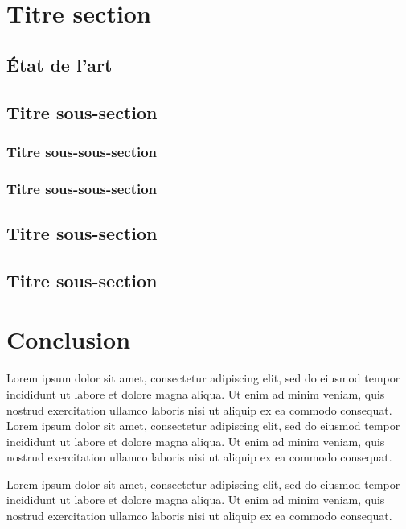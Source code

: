 \documentclass[a4paper]{book}
\begin{document}
\section{Titre section}

\subsection{État de l'art}

\subsection{Titre sous-section}

\subsubsection{Titre sous-sous-section}

\subsubsection{Titre sous-sous-section}

\subsection{Titre sous-section}

\subsection{Titre sous-section}

\section{Conclusion}

Lorem ipsum dolor sit amet, consectetur adipiscing elit, sed do eiusmod tempor
incididunt ut labore et dolore magna aliqua. Ut enim ad minim veniam, quis
nostrud exercitation ullamco laboris nisi ut aliquip ex ea commodo consequat.
Lorem ipsum dolor sit amet, consectetur adipiscing elit, sed do eiusmod tempor
incididunt ut labore et dolore magna aliqua. Ut enim ad minim veniam, quis
nostrud exercitation ullamco laboris nisi ut aliquip ex ea commodo consequat.

Lorem ipsum dolor sit amet, consectetur adipiscing elit, sed do eiusmod tempor
incididunt ut labore et dolore magna aliqua. Ut enim ad minim veniam, quis
nostrud exercitation ullamco laboris nisi ut aliquip ex ea commodo consequat.
\end{document}
